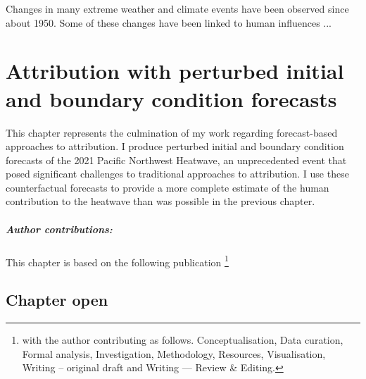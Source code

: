 {\onehalfspacing%
\begin{savequote}[8cm]
  Changes in many extreme weather and climate events have been observed since about 1950. Some of these changes have been linked to human influences ...
\end{savequote}
    
\chapter{\label{ch4}Attribution with perturbed initial and boundary condition forecasts}

This chapter represents the culmination of my work regarding forecast-based approaches to attribution. I produce perturbed initial and boundary condition forecasts of the 2021 Pacific Northwest Heatwave, an unprecedented event that posed significant challenges to traditional approaches to attribution. I use these counterfactual forecasts to provide a more complete estimate of the human contribution to the heatwave than was possible in the previous chapter. 
{\small\paragraph{Author contributions:} This chapter is based on the following publication \footnote{with the author contributing as follows. Conceptualisation, Data curation, Formal analysis, Investigation, Methodology, Resources, Visualisation, Writing -- original draft and Writing --- Review \& Editing.} \par\vspace{1em}
}

\clearpage

\minitoc

\clearpage}

\section{Chapter open}\label{ch4:open}

